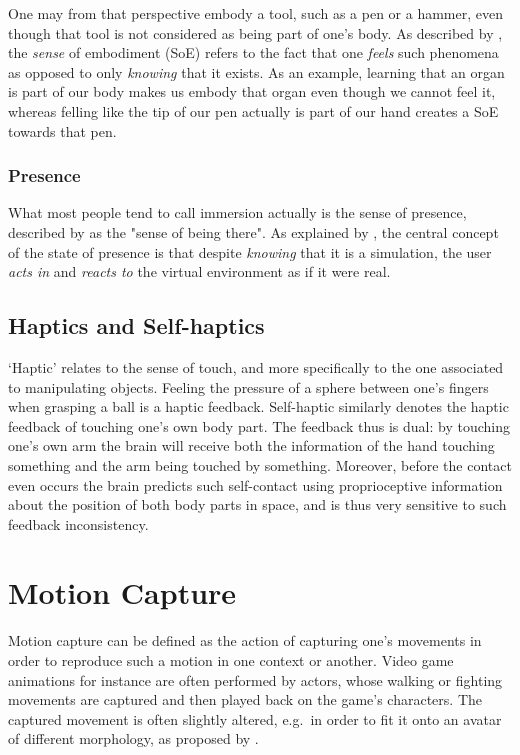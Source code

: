 One may from that perspective embody a tool, such as a pen or a hammer, even though that tool is not considered as being part of one's body. As described by \cite{de2011embodiment}, the \textit{sense} of embodiment (SoE) refers to the fact that one \textit{feels} such phenomena as opposed to only \textit{knowing} that it exists. As an example, learning that an organ is part of our body makes us embody that organ even though we cannot feel it, whereas felling like the tip of our pen actually is part of our hand creates a SoE towards that pen.

\subsubsection{Presence}
What most people tend to call immersion actually is the sense of presence, described by \cite{held1992telepresence,slater1993representations} as the "sense of being there". As explained by \cite{debarba2017embodiment}, the central concept of the state of presence is that despite \textit{knowing} that it is a simulation, the user \textit{acts in} and \textit{reacts to} the virtual environment as if it were real.

\subsection{Haptics and Self-haptics}

`Haptic' relates to the sense of touch, and more specifically to the one associated to manipulating objects. Feeling the pressure of a sphere between one's fingers when grasping a ball is a haptic feedback. Self-haptic similarly denotes the haptic feedback of touching one's own body part. The feedback thus is dual: by touching one's own arm the brain will receive both the information of the hand touching something and the arm being touched by something. Moreover, before the contact even occurs the brain predicts such self-contact using proprioceptive information about the position of both body parts in space, and is thus very sensitive to such feedback inconsistency.

\section{Motion Capture}
\label{sec:mocap}
Motion capture can be defined as the action of capturing one's movements in order to reproduce such a motion in one context or another. Video game animations for instance are often performed by actors, whose walking or fighting movements are captured and then played back on the game's characters. The captured movement is often slightly altered, e.g.\ in order to fit it onto an avatar of different morphology, as proposed by \cite{molla2017egocentric}.


